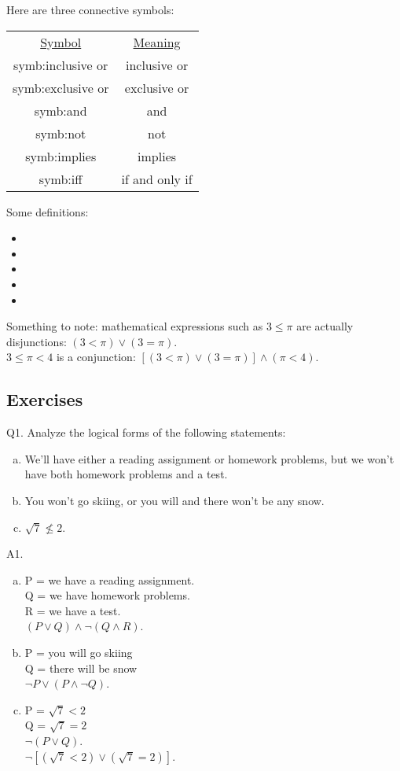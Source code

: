 \documentclass{article}
\begin{document}
Here are three connective symbols:
\begin{center}
\begin{tabular}{@{}cc@{}}
	\underline{Symbol} & \underline{Meaning} \\
	\gls{symb:inclusive or} & inclusive or \\
	\gls{symb:exclusive or} & exclusive or \\
	\gls{symb:and} & and \\
	\gls{symb:not} & not \\
    \gls{symb:implies} & implies \\
    \gls{symb:iff} & if and only if
\end{tabular}
\end{center}

Some definitions:\\
\begin{itemize}
	\item {}
	\item {}
	\item {}
    \item {}
	\item {}
\end{itemize}
\noindent
Something to note: mathematical expressions such as $3 \leq \pi$ are actually disjunctions: $(3 < \pi) \lor (3 = \pi)$.\\
$3 \leq \pi < 4$ is a conjunction: $[(3 < \pi) \lor (3 = \pi)] \land (\pi < 4)$.\\

\subsection{Exercises}
Q1. Analyze the logical forms of the following statements:
\begin{enumerate}[(a)]
	\item We’ll have either a reading assignment or homework problems, but we won’t have both homework problems and a test.
	\item You won’t go skiing, or you will and there won’t be any snow.
	\item $\sqrt{7} \nleq 2$.
\end{enumerate}
A1.
\begin{enumerate}[(a)]
\item
P = we have a reading assignment.\\
Q = we have homework problems.\\
R = we have a test.\\
$(P \lor Q) \land \lnot(Q \land R)$.
\item
P = you will go skiing\\
Q = there will be snow\\
$\lnot P \lor (P \land \lnot Q)$.
\item
P = $\sqrt{7} < 2$\\
Q = $\sqrt{7} = 2$\\
$\lnot(P \lor Q)$.\\
$\lnot[(\sqrt{7} < 2) \lor (\sqrt{7} = 2)]$.
\end{enumerate}
\end{document}

